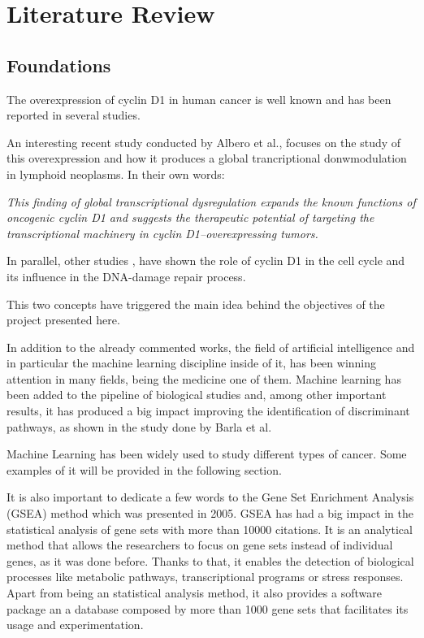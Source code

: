 
\section{Literature Review}
\subsection{Foundations}

The overexpression of cyclin D1 in human cancer is well known\cite{Lamb2003} and has been reported in several studies\cite{2017Reena}.

An interesting recent study conducted by Albero et al.\cite{10.1172/JCI96520}, focuses on the study of this overexpression and how it produces a global trancriptional donwmodulation in lymphoid neoplasms. In their own words:

\textit{This finding of global transcriptional dysregulation expands the known functions of oncogenic cyclin D1 and suggests the therapeutic potential of targeting the transcriptional machinery in cyclin D1–overexpressing tumors.}
\cite{10.1172/JCI96520}

In parallel, other studies \cite{DiSante2017} \cite{Casimiro2016}, have shown the role of cyclin D1 in the cell cycle and its influence in the DNA-damage repair process.

This two concepts have triggered the main idea behind the objectives of the project presented here.

In addition to the already commented works, the field of artificial intelligence and in particular the machine learning discipline inside of it, has been winning attention in many fields, being the medicine one of them.
Machine learning has been added to the pipeline of biological studies and, among other important results, it has produced a big impact improving the identification of discriminant pathways, as shown in the study done by Barla et al\cite{Barla2014}.

Machine Learning has been widely used to study different types of cancer.
Some examples of it will be provided in the following section.

It is also important to dedicate a few words to the Gene Set Enrichment Analysis (GSEA) method \cite{Subramanian15545} which was presented in 2005.
GSEA has had a big impact in the statistical analysis of gene sets with more than 10000 citations.
It is an analytical method that allows the researchers to focus on gene sets instead of individual genes, as it was done before.
Thanks to that, it enables the detection of biological processes like metabolic pathways, transcriptional programs or stress responses. 
Apart from being an statistical analysis method, it also provides a software package an a database composed by more than 1000 gene sets that facilitates its usage and experimentation.

